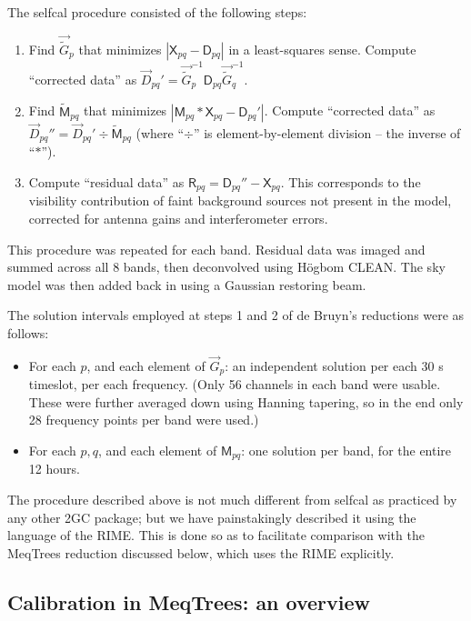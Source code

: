 \documentclass[]{aa}
\newcommand{\jones}[2]{\vec {#1}_{#2}}
\newcommand{\jonesinv}[2]{\vec {#1}^{-1}_{#2}}
\newcommand{\coh}[2]{\mathsf{{#1}}_{{#2}}}
\begin{document}
The selfcal procedure consisted of the following steps:

\begin{enumerate}
\item Find $\jones{\tilde{G}}{p}$ that minimizes $|\coh{X}{pq} - \coh{D}{pq}|$ in a least-squares sense. Compute ``corrected data'' as $\jones{D}{pq}' = \jonesinv{\tilde{G}}{p} \coh{D}{pq} \jonesinv{\tilde{G}}{q}.$

\item Find $\coh{\tilde{M}}{pq}$ that minimizes $|\coh{M}{pq} \ast \coh{X}{pq} - \coh{D}{pq}'|$.
Compute ``corrected data'' as $\jones{D}{pq}'' = \jones{D}{pq}' \div \coh{\tilde{M}}{pq}$ (where ``$\div$'' is element-by-element division -- the inverse of ``$\ast$'').

\item Compute ``residual data'' as $\coh{R}{pq} = \coh{D}{pq}'' - \coh{X}{pq}$. This corresponds to the visibility contribution of faint background sources not present in the model, corrected for antenna gains and interferometer errors.

\end{enumerate}

This procedure was repeated for each band. Residual data was imaged and summed across all 8 bands, then  deconvolved using H\"ogbom CLEAN. The sky model was then added back in using a Gaussian restoring beam.

The solution intervals employed at steps 1 and 2 of de Bruyn's reductions were as follows:

\begin{itemize}
\item For each $p$, and each element of $\jones{G}{p}$: an independent solution per each 30 s timeslot, per each frequency. (Only 56 channels in each band were usable. These were further averaged down using Hanning tapering, so in the end only 28 frequency points per band were used.)
\item For each $p,q$, and each element of $\coh{M}{pq}$: one solution per band, for the entire 12 hours.
\end{itemize}

The procedure described above is not much different from selfcal as practiced by any other 2GC package; but we have painstakingly described it using the language of the RIME. This is done so as to facilitate comparison with the MeqTrees reduction discussed below, which uses the RIME explicitly.

\subsection{Calibration in MeqTrees: an overview}
\end{document}
